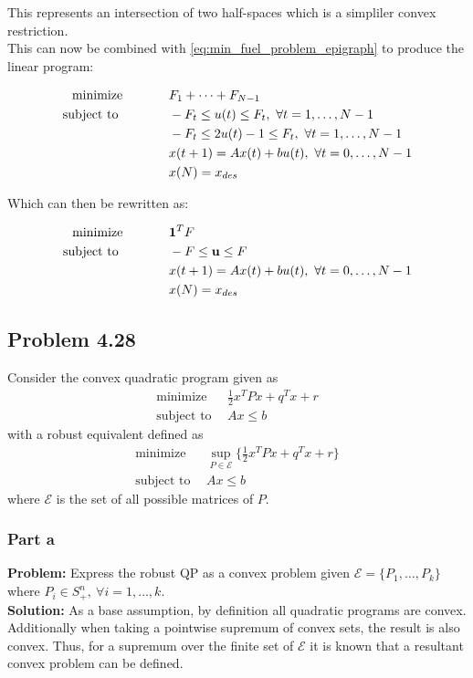 \documentclass[letter]{article}
\newcommand{\optpblm}[3][eq:default]{
	\begin{equation}\label{#1}
		\begin{aligned}
			\text{minimize} \hspace{0.5in} &#2\vspace{5pt}\\
			\text{subject to \hspace{0.5in}} &#3
		\end{aligned}	
	\end{equation}
}
\begin{document}
This represents an intersection of two half-spaces which is a simpliler convex restriction.\\
This can now be combined with \eqref{eq:min_fuel_problem_epigraph} to produce the linear program:
\optpblm[eq:min_fuel_problem_result]{F_1 + \cdots + F_{N-1}}{
	-F_t \leq u(t) \leq F_t, \ \forall t = 1, \dots, N-1\\
	&-F_t \leq 2u(t) -1 \leq F_t, \ \forall t = 1, \dots, N-1\\
	& x(t+1) = A x(t) + b u(t), \ \forall t = 0,\dots,N-1\\
	&x(N) = x_{des}}
Which can then be rewritten as:
\optpblm[eq:min_fuel_problem_result]{\vb{1}^T F}{
		-F \leq \vb{u} \leq F\\
		& x(t+1) = A x(t) + b u(t), \ \forall t = 0,\dots,N-1\\
		&x(N) = x_{des}}


\newpage
\subsection{Problem 4.28}
Consider the convex quadratic program given as
\begin{equation}\label{eq:convex_quadratic_program}
	\begin{aligned}
		\text{minimize} \ \ & \frac{1}{2} x^T P x + q^T x + r\\
		\text{subject to} \ \ & Ax \leq b
	\end{aligned}
\end{equation}
with a robust equivalent defined as
\begin{equation}\label{eq:robust_convex_quadratic_program}
	\begin{aligned}
		\text{minimize} \ \ & \sup_{P\in \mathcal{E}}\{\frac{1}{2} x^T P x + q^T x + r\}\\
		\text{subject to} \ \ & Ax \leq b
	\end{aligned}
\end{equation}
where $\mathcal{E}$ is the set of all possible matrices of $P$.

\subsubsection{Part a}
\textbf{Problem:}
Express the robust QP as a convex problem given $\mathcal{E} = \{P_1,\dots,P_k\}$ where $P_i\in S^n_+, \ \forall i=1,\dots,k$.\\

\textbf{Solution:}
As a base assumption, by definition all quadratic programs are convex. Additionally when taking a pointwise supremum of convex sets, the result is also convex.
Thus, for a supremum over the finite set of $\mathcal{E}$ it is known that a resultant convex problem can be defined.\\
\end{document}
